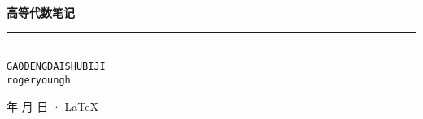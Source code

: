 \documentclass[cn,11pt,blue,normal,founder]{elegantbook}
\begin{document}
\newcommand\mfrac[2]{\dfrac{#1\smash[b]{\strut}}{#2\smash[t]{\strut}}}
\newcommand\RR{\mathbb{R}}
\newcommand\NN{\mathbb{N}}
\newcommand\QQ{\mathbb{Q}}
\newcommand\CC{\mathbb{C}}
\newcommand\ee{\mathrm{e}}
\newcommand\dd{\mathrm{d}}
\newcommand\uppi{\mathrm{\pi}}

\newcommand\rank{\operatorname{rank}}
\newcommand\diag{\operatorname{diag}}
\renewcommand\Im{\operatorname{Im}}
\newcommand\tr{\operatorname{tr}}

\newcommand\aaa{\boldsymbol{\alpha}}
\newcommand\AAA{\boldsymbol{A}}
\newcommand\bbb{\boldsymbol{\beta}}
\newcommand\eee{\boldsymbol{\eta}}
\renewcommand\ggg{\boldsymbol{\gamma}}
\newcommand\XXX{\boldsymbol{X}}
\newcommand\YYY{\boldsymbol{Y}}
\newcommand\ling{\boldsymbol{0}}

\begin{titlepage}
	\vspace*{25ex}%
	\begin{minipage}{.9\textwidth}
	\flushright
		{\textbf{高等代数笔记}}\\%
		\rule{\linewidth}{1pt}\\ \vspace{2ex}
		{\texttt{GAODENGDAISHUBIJI}} \\%
		\vspace{20ex}%
		{\texttt{rogeryoungh}}%
	\end{minipage}
	\vfill\centering
	{\number\year 年 \number\month 月 \number\day 日 · \LaTeX{}}
\end{titlepage}
\clearpage{\hypersetup{hidelinks}\tableofcontents}

\clearpage

\end{document}
